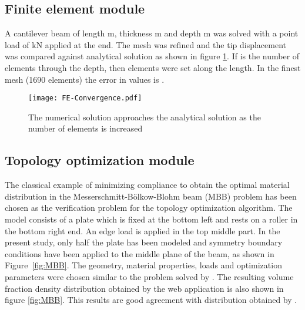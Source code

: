 \documentclass[preprint]{elsarticle}
\begin{document}
\begin{table}
\caption{Comparison of results between analytical and web application. Positive values denote tension and negative denotes compression.}
\label{tab:Verification1}
\centering
\small
{}
\normalsize
\end{table}


\subsection{Finite element module}\label{FEM}
A cantilever beam of length m, thickness m and depth m was solved with a point load of kN applied at the end. The mesh was refined and the tip displacement was compared against analytical solution  as shown in figure \ref{fig:FEconvergence}. If  is the number of elements through the depth, then  elements were set along the length. In the finest mesh (1690 elements) the error in values is .

\begin{figure}[!h]
	\centering
	\texttt{[image: FE-Convergence.pdf]}
	\caption{The numerical solution approaches the analytical solution as the number of elements is increased}
	\label{fig:FEconvergence}
\end{figure}


\subsection{Topology optimization module} \label{TopoPlate}
The classical example of minimizing compliance to obtain the optimal
material distribution in the  Messerschmitt-B\"{o}lkow-Blohm beam (MBB) problem
has been chosen as the verification problem for the topology optimization algorithm. The model consists of a plate which is fixed at the bottom left and rests on a roller in the bottom right end. An edge load is applied in the top middle part. In the present study, only half the plate has been modeled and symmetry boundary conditions have been applied to the middle plane of the beam, as shown in
Figure~\ref{fig:MBB}. The geometry, material properties, loads and optimization
parameters were chosen similar to the problem solved by \citet{sigmund200199}. The resulting volume fraction density distribution
obtained by the web application is also shown in figure \ref{fig:MBB}. This
results are good agreement with distribution obtained by \citet{sigmund200199}.
\end{document}
